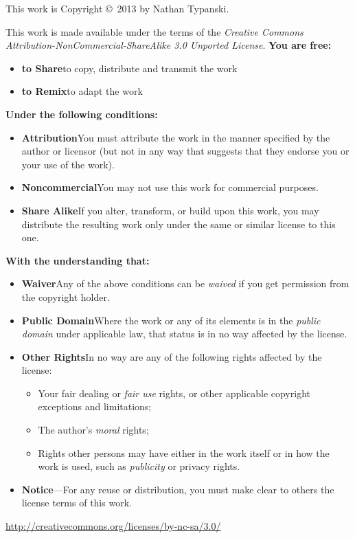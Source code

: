 \begin{center}
This work is Copyright \copyright\ 2013 by Nathan Typanski.
\end{center}

This work is made available under the terms of the \emph{Creative Commons
    Attribution-NonCommercial-ShareAlike 3.0 Unported License}.
\textbf{You are free:}
\begin{itemize}
  \item[] \textbf{to Share}\dash{}to copy, distribute and transmit the work
  \item[] \textbf{to Remix}\dash{}to adapt the work
\end{itemize}

\textbf{Under the following conditions:}
\begin{itemize}
  \item[]\ccby\textbf{Attribution}\dash{}You must attribute the work in the manner
      specified by the author or licensor (but not in any way that suggests that
      they endorse you or your use of the work).
  \item[] \ccnc\textbf{Noncommercial}\dash{}You may not use this work for
      commercial purposes.
  \item[] \ccsa\textbf{Share Alike}\dash{}If you alter, transform, or build upon
      this work, you may distribute the resulting work only under the same or
      similar license to this one.
\end{itemize}

\textbf{With the understanding that:}
\begin{itemize}
  \item[]\textbf{Waiver}\dash{}Any of the above conditions can be \emph{waived} if
      you get permission from the copyright holder.
  \item[]\textbf{Public Domain}\dash{}Where the work or any of its elements is in
      the \emph{public domain} under applicable law, that status is in no way
      affected by the license.
  \item[]\textbf{Other Rights}\dash{}In no way are any of the following rights
      affected by the license:
  \begin{itemize}
    \item Your fair dealing or \emph{fair use} rights, or other applicable
        copyright exceptions and limitations;
    \item The author's \emph{moral} rights;
    \item Rights other persons may have either in the work itself or in how the
        work is used, such as \emph{publicity} or privacy rights.
  \end{itemize}
  \item[]\textbf{Notice}---For any reuse or distribution, you must make clear
      to others the license terms of this work.
\end{itemize}
\begin{center}
  \url{http://creativecommons.org/licenses/by-nc-sa/3.0/}

  \cc{}
\end{center}
